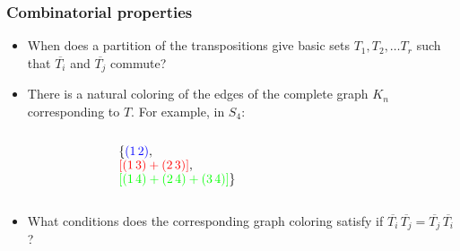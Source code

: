 \documentclass{beamer}
\begin{document}
\begin{frame}
\frametitle{Combinatorial properties}
\begin{itemize}
\item When does a partition of the transpositions give basic sets
  $T_1, T_2,\ldots T_r$ such that $\overline{T_i}$ and
  $\overline{T_j}$ commute?\pause
\item There is a natural coloring of the edges of the complete graph
  $K_n$ corresponding to $T$. \pause For example, in $S_4$:
\vspace{.5cm}
\begin{columns}
\begin{figure}
\end{figure}
$\{\textcolor{blue}{(1\,2)},$\\
$\textcolor{red}{[(1\,3)+(2\,3)]},$\\ 
$\textcolor{green}{[(1\,4)+(2\,4)+(3\,4)]}\}$
\end{columns}
\vspace{.5cm}\pause
\item What conditions does the corresponding graph coloring satisfy if
  $\overline{T_i}\,\overline{T_j} = \overline{T_j}\,\overline{T_i}$?
\end{itemize}
\end{frame}

\end{document}
